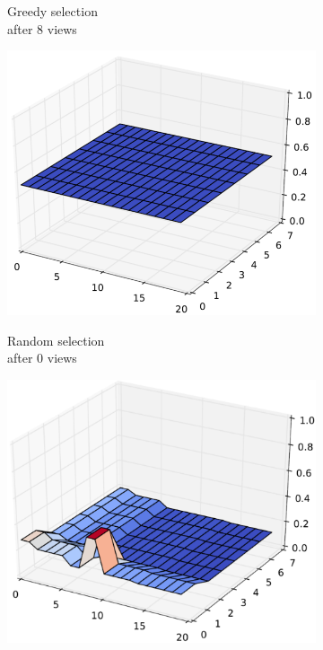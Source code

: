 \documentclass[letterpaper, 10 pt, conference]{ieeeconf}  %
\begin{document}
\begin{figure}
\begin{subfigure}[b]{.24\textwidth}
        \caption{Greedy selection \\ after 8 views}
        \vspace*{2mm}
        \label{fig:greedy8view}
    \end{subfigure}
    \hfill
    \begin{subfigure}[b]{.24\textwidth}
        \centering
        {\includegraphics[width=.99\textwidth]{random1.png}}
        \caption{Random selection \\ after 0 views}
        \vspace*{2mm}
        \label{fig:rand0view}
    \end{subfigure}
    \hfill
    \begin{subfigure}[b]{.24\textwidth}
        \centering
        {\includegraphics[width=.99\textwidth]{random2.png}}

\end{subfigure}
\end{figure}
\end{document}
